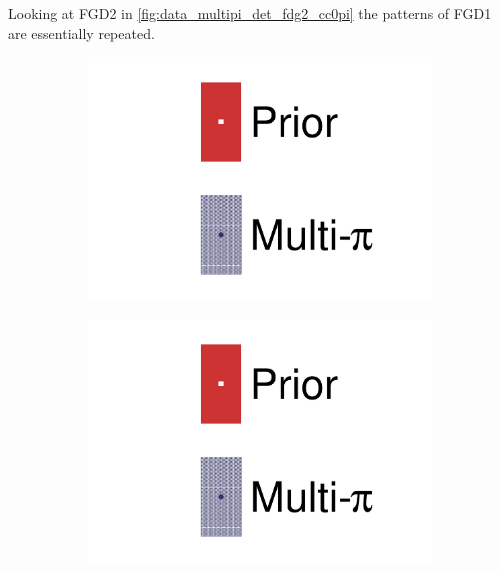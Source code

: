 Looking at FGD2 in \autoref{fig:data_multipi_det_fdg2_cc0pi} the patterns of FGD1 are essentially repeated.
\begin{figure}[h]
	\centering
	\begin{subfigure}[t]{0.32\textwidth}
		\includegraphics[width=\textwidth,page=33, trim={0mm 0mm 0mm 0mm}, clip]{figures/mach3/2018/data/2018a_FixedCov_RedCov_Mpi_Data_merge_drawPar_withDet}
	\end{subfigure}
	\begin{subfigure}[t]{0.32\textwidth}
		\includegraphics[width=\textwidth,page=34, trim={0mm 0mm 0mm 0mm}, clip]{figures/mach3/2018/data/2018a_FixedCov_RedCov_Mpi_Data_merge_drawPar_withDet}
	\end{subfigure}
	\begin{subfigure}[t]{0.32\textwidth}

\end{subfigure}
\end{figure}
